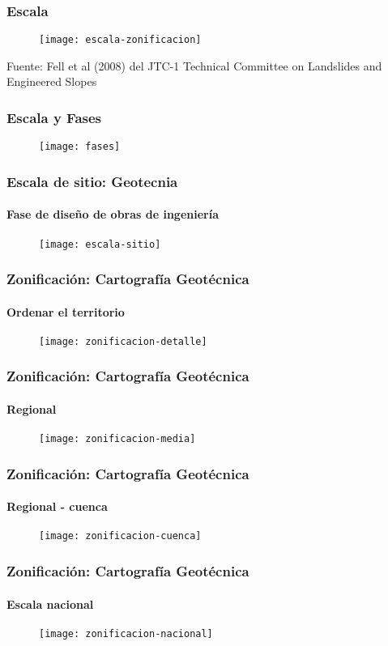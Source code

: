\documentclass[12pt]{beamer}
\begin{document}
\begin{frame}
\frametitle{Escala}
\begin{figure}
\centering
\texttt{[image: escala-zonificacion]} 
\end{figure}
\tiny{Fuente: Fell et al (2008) del JTC-1 Technical Committee on Landslides and Engineered Slopes}
\end{frame}
\begin{frame}
\frametitle{Escala y Fases}
\begin{figure}
\centering
\texttt{[image: fases]} 
\end{figure}
\end{frame}
\begin{frame}
\frametitle{Escala de sitio: Geotecnia}
\framesubtitle{Fase de diseño de obras de ingeniería}
\begin{figure}
\centering
\texttt{[image: escala-sitio]} 
\end{figure}
\end{frame}
\begin{frame}
\frametitle{Zonificación: Cartografía Geotécnica}
\framesubtitle{Ordenar el territorio}
\begin{figure}
\centering
\texttt{[image: zonificacion-detalle]} 
\end{figure}
\end{frame}
\begin{frame}
\frametitle{Zonificación: Cartografía Geotécnica}
\framesubtitle{Regional}
\begin{figure}
\centering
\texttt{[image: zonificacion-media]} 
\end{figure}
\end{frame}
\begin{frame}
\frametitle{Zonificación: Cartografía Geotécnica}
\framesubtitle{Regional - cuenca}
\begin{figure}
\centering
\texttt{[image: zonificacion-cuenca]} 
\end{figure}
\end{frame}
\begin{frame}
\frametitle{Zonificación: Cartografía Geotécnica}
\framesubtitle{Escala nacional}
\begin{figure}
\centering
\texttt{[image: zonificacion-nacional]} 
\end{figure}
\end{frame}
\end{document}
